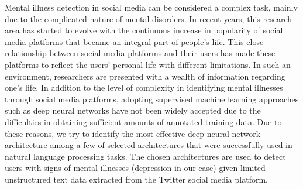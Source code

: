 Mental illness detection in social media can be considered a complex task, mainly due to the complicated nature of mental disorders. In recent years, this research area has started to evolve with the continuous increase in popularity of social media platforms that became an integral part of people's life. This close relationship between social media platforms and their users has made these platforms to reflect the users' personal life with different limitations. In such an environment, researchers are presented with a wealth of information regarding one's life. In addition to the level of complexity in identifying mental illnesses through social media platforms, adopting supervised machine learning approaches such as deep neural networks have not been widely accepted due to the difficulties in obtaining sufficient amounts of annotated training data. Due to these reasons, we try to identify the most effective deep neural network architecture among a few of selected architectures that were successfully used in natural language processing tasks. The chosen architectures are used to detect users with signs of mental illnesses (depression in our case) given limited unstructured text data extracted from the Twitter social media platform.
